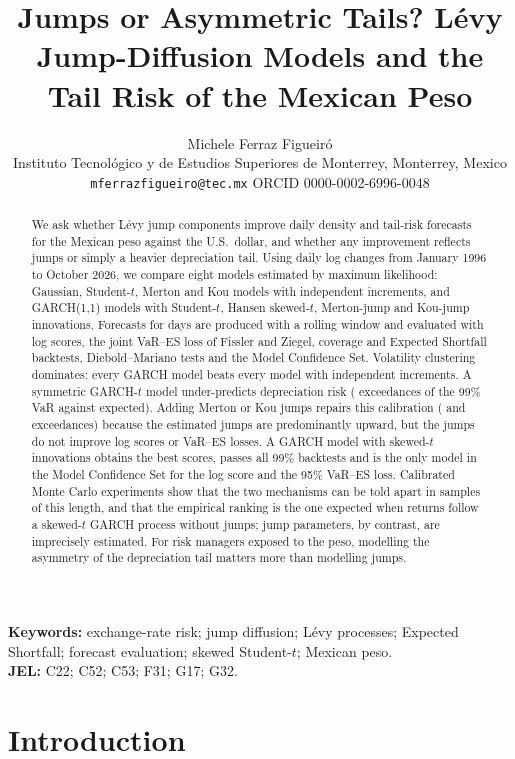 \documentclass[11pt]{article}
\title{Jumps or Asymmetric Tails? Lévy Jump-Diffusion Models and the Tail Risk of the Mexican Peso}
\author{Michele Ferraz Figueiró\\[2pt]
\small Instituto Tecnológico y de Estudios Superiores de Monterrey, Monterrey, Mexico\\
\small \texttt{mferrazfigueiro@tec.mx} \quad ORCID 0000-0002-6996-0048}
\date{}
\begin{document}
\maketitle

\begin{abstract}
\noindent
We ask whether Lévy jump components improve daily density and tail-risk forecasts for the Mexican peso against the U.S.\ dollar, and whether any improvement reflects jumps or simply a heavier depreciation tail. Using \nMain{} daily log changes from January 1996 to October 2026, we compare eight models estimated by maximum likelihood: Gaussian, Student-$t$, Merton and Kou models with independent increments, and GARCH(1,1) models with Student-$t$, Hansen skewed-$t$, Merton-jump and Kou-jump innovations. Forecasts for \oosN{} days are produced with a rolling window and evaluated with log scores, the joint VaR--ES loss of Fissler and Ziegel, coverage and Expected Shortfall backtests, Diebold--Mariano tests and the Model Confidence Set. Volatility clustering dominates: every GARCH model beats every model with independent increments. A symmetric GARCH-$t$ model under-predicts depreciation risk (\excNNGarchT{} exceedances of the 99\% VaR against \expNinetyNine{} expected). Adding Merton or Kou jumps repairs this calibration (\excNNGarchMerton{} and \excNNGarchKou{} exceedances) because the estimated jumps are predominantly upward, but the jumps do not improve log scores or VaR--ES losses. A GARCH model with skewed-$t$ innovations obtains the best scores, passes all 99\% backtests and is the only model in the Model Confidence Set for the log score and the 95\% VaR--ES loss. Calibrated Monte Carlo experiments show that the two mechanisms can be told apart in samples of this length, and that the empirical ranking is the one expected when returns follow a skewed-$t$ GARCH process without jumps; jump parameters, by contrast, are imprecisely estimated. For risk managers exposed to the peso, modelling the asymmetry of the depreciation tail matters more than modelling jumps.
\end{abstract}

\noindent\textbf{Keywords:} exchange-rate risk; jump diffusion; Lévy processes; Expected Shortfall; forecast evaluation; skewed Student-$t$; Mexican peso.\\
\noindent\textbf{JEL:} C22; C52; C53; F31; G17; G32.

\section{Introduction}
\end{document}
